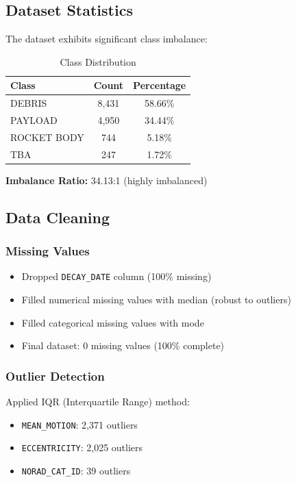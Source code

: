 \documentclass[12pt,a4paper]{article}
\begin{document}
\subsection{Dataset Statistics}
The dataset exhibits significant class imbalance:
\begin{table}[H]
\centering
\begin{tabular}{@{}lcc@{}}
\toprule
\textbf{Class} & \textbf{Count} & \textbf{Percentage} \\
\midrule
DEBRIS & 8,431 & 58.66\% \\
PAYLOAD & 4,950 & 34.44\% \\
ROCKET BODY & 744 & 5.18\% \\
TBA & 247 & 1.72\% \\
\bottomrule
\end{tabular}
\caption{Class Distribution}
\label{tab:class_dist}
\end{table}

\textbf{Imbalance Ratio:} 34.13:1 (highly imbalanced)

\subsection{Data Cleaning}
\subsubsection{Missing Values}
\begin{itemize}
    \item Dropped \texttt{DECAY\_DATE} column (100\% missing)
    \item Filled numerical missing values with median (robust to outliers)
    \item Filled categorical missing values with mode
    \item Final dataset: 0 missing values (100\% complete)
\end{itemize}

\subsubsection{Outlier Detection}
Applied IQR (Interquartile Range) method:
\begin{itemize}
    \item \texttt{MEAN\_MOTION}: 2,371 outliers
    \item \texttt{ECCENTRICITY}: 2,025 outliers
    \item \texttt{NORAD\_CAT\_ID}: 39 outliers
\end{itemize}
\end{document}
